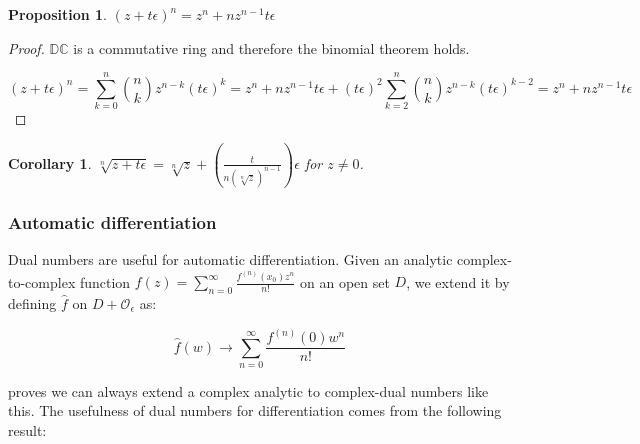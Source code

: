 \documentclass{article}
\newtheorem{proposition}[theorem]{Proposition}
\newtheorem{corollary}[theorem]{Corollary}
\newcommand{\DC}{\mathbb{DC}}
\newcommand{\Z}{\mathcal{O}_\e}
\newcommand{\e}{\epsilon}
\begin{document}
\begin{proposition}
$(z + t\e)^n = z^n + n z^{n-1} t \e$
\end{proposition}
\begin{proof}
$\DC$ is a commutative ring and therefore the binomial theorem holds.

\noindent \begin{equation}
(z + t\e)^n = \sum_{k=0}^n \binom{n}{k} z^{n-k}(t\e)^k = z^n + nz^{n-1}t\e + (t\e)^2 \sum_{k=2}^n \binom{n}{k} z^{n-k}(t\e)^{k-2} = z^n + nz^{n-1}t\e
\end{equation}
\end{proof}

\begin{corollary}
$\sqrt[n]{z + t \e} = \sqrt[n]{z} + (\frac{t}{n(\sqrt[n]{z})^{n-1}}) \e$ for $z \neq 0$.
\end{corollary}

\subsubsection*{Automatic differentiation}

Dual numbers are useful for automatic differentiation. Given an analytic complex-to-complex function $f(z) = \sum_{n=0}^\infty \frac{f^{(n)}(x_0) z^n}{n!}$ on an open set $D$, we extend it by defining $\hat{f}$ on $D + \Z$ as:

\begin{equation}
        \hat{f}(w) \to \sum_{n=0}^\infty \frac{f^{(n)}(0) w^n}{n!}
\end{equation}

\cite{messelmi2015} proves we can always extend a complex analytic to complex-dual numbers like this.
The usefulness of dual numbers for differentiation comes from the following result:
\end{document}
